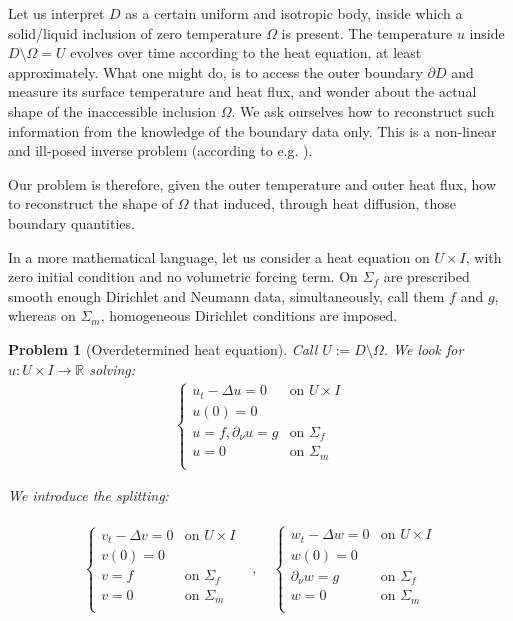 \documentclass[english,a4paper,9pt,oneside]{scrbook}	%
\theoremstyle{break}
\newtheorem{pb}[equation]{Problem}
\theoremstyle{remark}
\newcommand{\mR}{\mathbb{R}}
\begin{document}
Let us interpret $D$ as a certain uniform and isotropic body, inside which a solid/liquid inclusion of zero temperature $\Omega$ is present. The temperature $u$ inside $D\setminus \Omega = U$ evolves over time according to the heat equation, at least approximately. What one might do, is to access the outer boundary $\partial D$ and measure its surface temperature and heat flux, and wonder about the actual shape of the inaccessible inclusion $\Omega$. We ask ourselves how to reconstruct such information from the knowledge of the boundary data only. This is a non-linear and ill-posed inverse problem (according to e.g. \cite{harbrecht}). 

Our problem is therefore, given the outer temperature and outer heat flux, how to reconstruct the shape of $\Omega$ that induced, through heat diffusion, those boundary quantities.

In a more mathematical language, let us consider a heat equation on $U\times I$, with zero initial condition and no volumetric forcing term. On $\Sigma_f$ are prescribed smooth enough Dirichlet and Neumann data, simultaneously, call them $f$ and $g$, whereas on $\Sigma_m$, homogeneous Dirichlet conditions are imposed.

\begin{pb}[Overdetermined heat equation]
\label{pb:pdes}
Call $U:=D\setminus \Omega$. We look for $u:U \times I \rightarrow \mR$ solving:
\begin{align*}
\left\{\begin{matrix}
u_t -\Delta u=0 & \text{on }U\times I \\ 
u(0)=0 & \\ 
u = f, \partial_\nu u=g & \text{on }\Sigma_f\\
u = 0 & \text{on }\Sigma_m\\
\end{matrix}\right.
\end{align*}

We introduce the splitting:

\begin{align*}
\begin{matrix}
\left\{\begin{matrix}
v_t -\Delta v=0 & \text{on }U\times I \\ 
v(0)=0 & \\ 
v = f& \text{on }\Sigma_f\\
v = 0 & \text{on }\Sigma_m\\
\end{matrix}\right. &, \quad  \left\{\begin{matrix}
w_t -\Delta w=0 & \text{on }U\times I \\ 
w(0)=0 & \\ 
\partial_\nu w=g & \text{on }\Sigma_f\\
w = 0 & \text{on }\Sigma_m\\
\end{matrix}\right.
\end{matrix}
\end{align*}
\end{pb}
\end{document}
